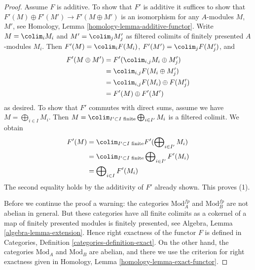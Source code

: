 \begin{proof}
Assume $F$ is additive. To show that $F'$ is additive it suffices to show
that $F'(M) \oplus F'(M') \to F'(M \oplus M')$ is an isomorphism for
any $A$-modules $M$, $M'$, see
Homology, Lemma \ref{homology-lemma-additive-functor}.
Write $M = \colim_i M_i$ and $M' = \colim_j M'_j$ as filtered colimits
of finitely presented $A$-modules $M_i$. Then
$F'(M) = \colim_i F(M_i)$, $F'(M') = \colim_j F(M'_j)$, and
\begin{align*}
F'(M \oplus M')
& =
F'(\colim_{i, j} M_i \oplus M'_j) \\
& =
\colim_{i, j} F(M_i \oplus M'_j) \\
& =
\colim_{i, j} F(M_i) \oplus F(M'_j) \\
& =
F'(M) \oplus F'(M')
\end{align*}
as desired. To show that $F'$ commutes with direct sums, assume
we have $M = \bigoplus_{i \in I} M_i$. Then
$M = \colim_{I' \subset I\text{ finite}} \bigoplus_{i \in I'} M_i$
is a filtered colimit. We obtain
\begin{align*}
F'(M)
& =
\colim_{I' \subset I\text{ finite}}
F'(\bigoplus\nolimits_{i \in I'} M_i) \\
& =
\colim_{I' \subset I\text{ finite}}
\bigoplus\nolimits_{i \in I'} F'(M_i) \\
& =
\bigoplus\nolimits_{i \in I} F'(M_i)
\end{align*}
The second equality holds by the additivity of $F'$ already shown.
This proves (1).

\medskip\noindent
Before we continue the proof a warning:
the categories $\text{Mod}^{fp}_A$ and $\text{Mod}^{fp}_B$
are not abelian in general. But these categories have all finite colimits as
a cokernel of a map of finitely presented modules is finitely presented,
see Algebra, Lemma \ref{algebra-lemma-extension}.
Hence right exactness of the functor $F$
is defined in Categories, Definition \ref{categories-definition-exact}.
On the other hand, the categories $\text{Mod}_A$ and $\text{Mod}_B$
are abelian, and there we use the criterion for right exactness given in
Homology, Lemma \ref{homology-lemma-exact-functor}.


\end{proof}
